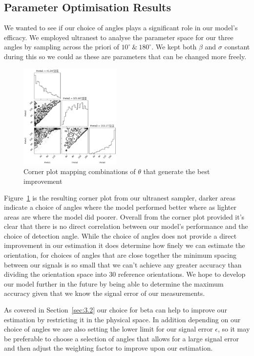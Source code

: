 \documentclass[final, 3p]{elsarticle}
\begin{document}
\subsection{Parameter Optimisation Results}
\label{sec:3.3}
We wanted to see if our choice of angles plays a significant role in our model's efficacy. We employed ultranest to analyse the parameter space for our three angles by sampling across the priori of $10^{\circ} \ \& \ 180^{\circ}$. We kept both $\beta$ and $\sigma$ constant during this so we could as these are parameters that can be changed more freely. 

\begin{figure}[h]
	\label{fig:corner}
	\centering
	\includegraphics[width=0.45\textwidth]{./Images/corneranglesfreed-1.png}
	\caption{Corner plot mapping combinations of $\theta$ that generate the best improvement}
\end{figure}

Figure~\ref{fig:corner} is the resulting corner plot from our ultranest sampler, darker areas indicate a choice of angles where the model performed better where as lighter areas are where the model did poorer. Overall from the corner plot provided it's clear that there is no direct correlation between our model's performance and the choice of detection angle. While the choice of angles does not provide a direct improvement in our estimation it does determine how finely we can estimate the orientation, for choices of angles that are close together the minimum spacing between our signals is so small that we can't achieve any greater accuracy than dividing the orientation space into 30 reference orientations. We hope to develop our model further in the future by being able to determine the maximum accuracy given that we know the signal error of our measurements.  

As covered in Section~\ref{sec:3.2} our choice for beta can help to improve our estimation by restricting it in the physical space. In addition depending on our choice of angles we are also setting the lower limit for our signal error $\epsilon$, so it may be preferable to choose a selection of angles that allows for a large signal error and then adjust the weighting factor to improve upon our estimation. 
\end{document}
